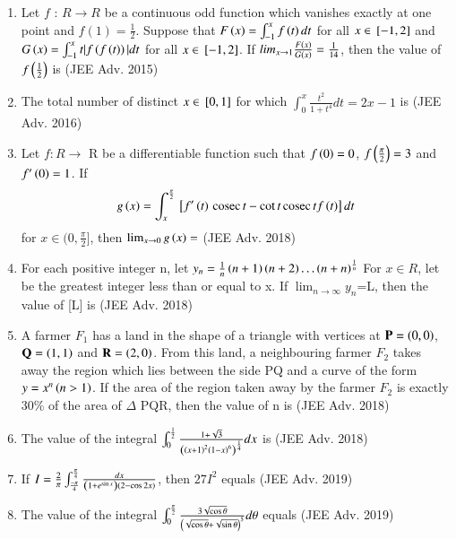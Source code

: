 \documentclass[journal,12pt,onecolumn]{IEEEtran}
\theoremstyle{remark}
\begin{document}
\begin{enumerate}
\item Let $f$ : $R \rightarrow R$ be a continuous odd function which vanishes exactly at one point and $f(1)=\frac{1}{2}$. Suppose that $F\left(x\right)=\int_{-1}^{x}f\left(t\right)dt$ for all $x\in{}\left[-1,2\right]$ and $G\left(x\right)=\int_{-1}^{x}t|f\left(f\left(t\right)\right)|dt$ for all $x\in {}\left[-1,2\right]$. If $lim_{x\to 1} \frac{F\left(x\right)}{G\left(x\right)}=\frac{1}{14}$, then the value of $f\left(\frac{1}{2}\right)$ is  \hfill{(JEE Adv. 2015)}

\item The total number of distinct $x\in{}\left[0,1\right]$ for which $\int_{0}^{x}\frac{t^2}{1+t^4}dt=2x-1$ is \hfill{(JEE Adv. 2016)}

\item Let $f:R\rightarrow$ R be a differentiable function such that $f\left(0\right)=0$, $f\left(\frac{\pi}{2}\right)=3$ and $f^\prime\left(0\right)=1$. If 
	\begin{align}
		g\left(x\right)=\int_{x}^{\frac{\pi}{2}}{}\left[f^\prime\left(t\right)\,\text{cosec}\, t -\cot t\,\text{cosec}\, tf\left(t\right)\right]dt
	\end{align}
		for $x\in \bigg(0,\frac{\pi}{2}\biggr]$, then $\lim_{x\to 0} g\left(x\right)= $   \hfill{(JEE Adv. 2018)}

\item For each positive integer n, let $y_n =\frac{1}{n}\left(n+1\right)\left(n+2\right)\dots\left(n+n\right)^{\frac{1}{n}}$ For $x \in R$, let  be the greatest integer less than  or equal to x. If $\lim_{n\to \infty} y_n$=L, then the value of [L] is \hfill{(JEE Adv. 2018)}

\item A farmer $F_1$ has a land in the shape of a triangle with vertices at $\mathbf{P}=\left(0,0\right)$,$\mathbf{Q}=\left(1,1\right)$ and $\mathbf{R}=\left(2,0\right)$. From this land, a neighbouring farmer $F_2$ takes away the region which lies between the side PQ and a curve of the form $y=x^n\left(n>1\right)$. If the area of the region taken away by the farmer $F_2$ is exactly 30\% of the area of $\Delta$ PQR, then the value of n is \hfill{(JEE Adv. 2018)} 

\item The value of the integral $\int_{0}^{\frac{1}{2}}\frac{1+\sqrt{3}}{\left(\left(x+1\right)^2\left(1-x\right)^6\right)^\frac{1}{4}}dx$ is \hfill{(JEE Adv. 2018)}

\item If $I=\frac{2}{\pi} \int_{\frac{-\pi}{4}}^{\frac{\pi}{4}} \frac{dx}{\left(1+e^{\sin x}\right)\left(2-\cos2x\right)}$, then $27I^2$ equals \hfill{(JEE Adv. 2019)}

\item The value of the integral 
		$\int_{0}^{\frac{\pi}{2}} \frac{3\sqrt{\cos\theta}}{\left(\sqrt{\cos\theta}+\sqrt{\sin\theta}\right)^5} d\theta$ equals \hfill{(JEE Adv. 2019)}
\end{enumerate}
\end{document}
